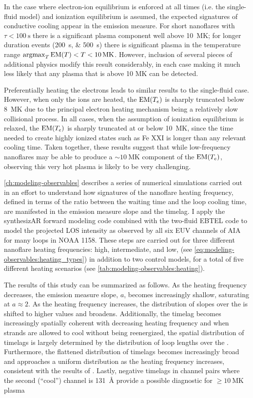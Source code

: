 In the case where electron-ion equilibrium is enforced at all times (i.e. the single-fluid model) and ionization equilibrium is assumed, the expected signatures of conductive cooling appear in the emission measure. For short nanoflares with $\tau<\SI{100}{\second}$ there is a significant plasma component well above \SI{10}{\mega\kelvin}; for longer duration events (\SIlist{200;500}{\second}) there is significant plasma in the temperature range $\argmax_T{\emd[T]} < T < \SI{10}{\mega\kelvin}$. However, inclusion of several pieces of additional physics modify this result considerably, in each case making it much less likely that any plasma that is above 10 MK can be detected.

Preferentially heating the electrons leads to similar results to the single-fluid case. However, when only the ions are heated, the $\emd$ is sharply truncated below \SI{8}{\mega\kelvin} due to the principal electron heating mechanism being a relatively slow collisional process. In all cases, when the assumption of ionization equilibrium is relaxed, the $\emd$ is sharply truncated at or below \SI{10}{\mega\kelvin}, since the time needed to create highly ionized states such as Fe XXI is longer than any relevant cooling time. Taken together, these results suggest that while low-frequency nanoflares may be able to produce a $\sim\SI{10}{\mega\kelvin}$ component of the $\emd$, observing this very hot plasma is likely to be very challenging. 

\autoref{ch:modeling-observables} describes a series of numerical simulations carried out in an effort to understand how signatures of the nanoflare heating frequency, defined in terms of the ratio between the waiting time and the loop cooling time, are manifested in the emission measure slope and the timelag. I apply the synthesizAR forward modeling code combined with the two-fluid EBTEL code to model the projected LOS intensity as observed by all six EUV channels of AIA for many loops in \AR{} NOAA 1158. These steps are carried out for three different nanoflare heating frequencies: high, intermediate, and low, (see \autoref{eq:modeling-observables:heating_types}) in addition to two control models, for a total of five different heating scenarios (see \autoref{tab:modeling-observables:heating}).

The results of this study can be summarized as follows. As the heating frequency decreases, the emission measure slope, $a$, becomes increasingly shallow, saturating at $a\approx2$. As the heating frequency increases, the distribution of slopes over the \AR{} is shifted to higher values and broadens. Additionally, the timelag becomes increasingly spatially coherent with decreasing heating frequency and when strands are allowed to cool without being reenergized, the spatial distribution of timelags is largely determined by the distribution of loop lengths over the \AR{}. Furthermore, the flattened distribution of timelags becomes increasingly broad and approaches a uniform distribution as the heating frequency increases, consistent with the results of \citet{viall_signatures_2016}. Lastly, negative timelags in channel pairs where the second (``cool'') channel is \SI{131}{\angstrom} provide a possible diagnostic for $\ge\SI{10}{\mega\kelvin}$ plasma


